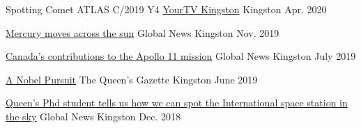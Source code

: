 \begin{cvhonors}
  \cvhonor
    {Spotting Comet ATLAS C/2019 Y4} %
    {\href{https://www.yourtv.tv/kingston}{YourTV Kingston}} %
    {Kingston} %
    {Apr. 2020} %

  \cvhonor
    {\href{https://globalnews.ca/video/6144759/an-unusual-event-will-take-place-on-november-11th-mercury-moves-across-the-sun}{Mercury moves across the sun}} %
    {Global News} %
    {Kingston} %
    {Nov. 2019} %
    
  \cvhonor
    {\href{https://globalnews.ca/video/5658433/connor-stone-queens-university-dept-of-physics-engineering-physics-astronomy-visits-global-news-morning}{Canada’s contributions to the Apollo 11 mission}} %
    {Global News} %
    {Kingston} %
    {July 2019} %
    
  \cvhonor
    {\href{https://www.queensu.ca/gazette/stories/nobel-pursuit}{A Nobel Pursuit}} %
    {The Queen's Gazette} %
    {Kingston} %
    {June 2019} %
    
  \cvhonor
    {\href{https://globalnews.ca/video/4750918/queens-phd-student-tells-us-how-we-can-spot-the-international-space-station-in-the-sky}{Queen’s Phd student tells us how we can spot the International space station in the sky}} %
    {Global News} %
    {Kingston} %
    {Dec. 2018} %
    
\end{cvhonors}

